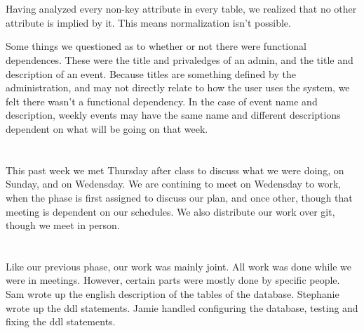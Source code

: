 \documentclass{article}
\begin{document}
\section{}
Having analyzed every non-key attribute in every table, we realized that no
other attribute is implied by it. This means normalization isn't possible. 

Some things we questioned as to whether or not there were functional
dependences. These were the title and privaledges of an admin, and the title and
description of an event. Because titles are something defined by the
administration, and may not directly relate to how the user uses the system, we
felt there wasn't a functional dependency. In the case of event name and
description, weekly events may have the same name and different descriptions
dependent on what will be going on that week.

\section{}




\section{}
This past week we met Thursday after class to discuss what we were doing, on
Sunday, and on Wedensday. We are contining to meet on Wedensday to work, when
the phase is first assigned to discuss our plan, and once other, though that
meeting is dependent on our schedules. We also distribute our work over git,
though we meet in person.

\section{}
Like our previous phase, our work was mainly joint. All work was done while we
were in meetings. However, certain parts were mostly done by specific people.
Sam wrote up the english description of the tables of the database. Stephanie
wrote up the ddl statements. Jamie handled configuring the database, testing and
fixing the ddl statements.  
\end{document}
